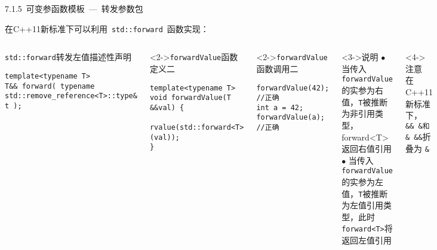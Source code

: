 \begin{frame}[fragile]{7.1.5~可变参函数模板\normalsize{~---~转发参数包}}

在C++11新标准下可以利用~\alert{\texttt{std::forward}}~函数实现：

\vspace{-4mm}

\begin{columns}[t]

\begin{blueblock}{\texttt{std::forward}转发左值描述性声明}
\vspace{-2mm}\begin{lstlisting}[basicstyle=\scriptsize\ttfamily,moreemph={T}]
template<typename T>
T&& forward( typename std::remove_reference<T>::type& t );
\end{lstlisting}\vspace{-2mm}
\end{blueblock}
\begin{blueblock}<2->{\texttt{forwardValue}函数定义二}
\vspace{-2mm}
\begin{lstlisting}[moreemph={T}]
template<typename T>
void forwardValue(T &&val) {
    rvalue(std::forward<T>(val));
}
\end{lstlisting}
\end{blueblock}
\begin{blueblock}<2->{\texttt{forwardValue}函数调用二}
\vspace{-2mm}
\begin{lstlisting}[moreemph={T}]
forwardValue(42);       //正确
int a = 42;
forwardValue(a);        //正确
\end{lstlisting}
\end{blueblock}

\begin{yellowblock}<3->{说明}
$\bullet$ 当传入\texttt{forwardValue}的实参为右值，\texttt{T}被推断为非引用类型，forward<T>返回右值引用\\
$\bullet$ 当传入\texttt{forwardValue}的实参为左值，\texttt{T}被推断为左值引用类型，此时\texttt{forward<T>}将返回左值引用
\end{yellowblock}
\vspace{-2mm}
\begin{redblock}<4->{注意}
在C++11新标准下，\\
\texttt{\&\& \&和\& \&\&}折叠为 \texttt{\&}
\end{redblock}
\end{columns}
\end{frame}

